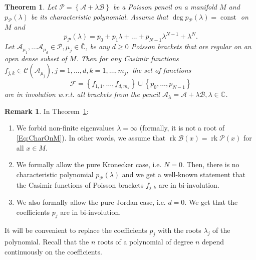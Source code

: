 \documentclass[12pt]{article}
\newtheorem{theorem}[lemma]{Theorem}
\theoremstyle{definition}
\newtheorem{remark}[lemma]{Remark}
\begin{document}
\begin{theorem} \label{Th:CasEigenComm} Let $\mathcal{P} = \left\{ \mathcal{A} + \lambda \mathcal{B} \right\}$ be a Poisson pencil on a manifold $M$ and $p_{\mathcal{P}}(\lambda)$ be its characteristic polynomial. Assume that $\deg p_{\mathcal{P}}(\lambda) = \operatorname{const}$ on $M$ and  \begin{equation} \label{Eq:CharOnM} p_{\mathcal{P}} (\lambda) = p_0 + p_1 \lambda + \dots + p_{N-1} \lambda^{N-1} + \lambda^N.\end{equation} Let $\mathcal{A}_{\mu_1}, \dots \mathcal{A}_{\mu_d} \in \mathcal{P}, \mu_j \in \bar{\mathbb{C}}$, be any $d\geq 0$ Poisson brackets that are regular on an open dense subset of $M$. Then for any Casimir functions $f_{j,k} \in \mathcal{C}\left( \mathcal{A}_{\mu_j}\right), j=1, \dots, d, k = 1,\dots, m_j,$ the set of functions \[ \mathcal{F} = \left\{ f_{1,1}, \dots, f_{d, m_d} \right\} \cup \left\{p_0, \dots, p_{N-1} \right\}\] are in involution w.r.t. all brackets from the pencil $\mathcal{A}_{\lambda} = \mathcal{A} + \lambda \mathcal{B}, \lambda \in \bar{\mathbb{C}}$.
\end{theorem}

\begin{remark} In Theorem~\ref{Th:CasEigenComm}:

\begin{enumerate}

\item We forbid non-finite eigenvalues $\lambda = \infty$ (formally, it is not a root of  \eqref{Eq:CharOnM}). In other words, we assume that $\operatorname{rk}\mathcal{B}(x) = \operatorname{rk}\mathcal{P}(x)$ for all $x \in M$.

\item We formally allow the pure Kronecker case, i.e. $N = 0$. Then, there is no characteristic polynomial $p_{\mathcal{P}}(\lambda)$ and we get a well-known statement that the Casimir functions of Poisson brackets $f_{j,k}$ are in bi-involution.

\item We also formally allow the pure Jordan case, i.e. $d = 0$. We get that the coefficients $p_j$ are in bi-involution.

\end{enumerate}


\end{remark}

It will be convenient to replace the coefficients $p_j$ with the roots $\lambda_j$ of the polynomial. Recall that the $n$ roots of a polynomial of degree $n$ depend continuously on the coefficients. 
\end{document}

